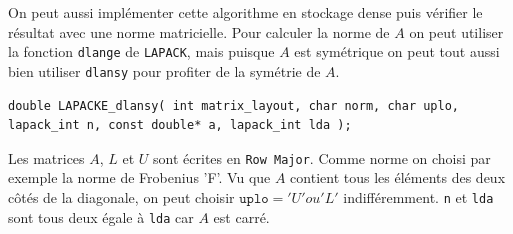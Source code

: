 \documentclass{article}
\begin{document}
On peut aussi implémenter cette algorithme en stockage dense puis vérifier le résultat avec une norme matricielle. Pour calculer la norme de $A$ on peut utiliser la fonction \texttt{dlange} de \texttt{LAPACK}, mais puisque $A$ est symétrique on peut tout aussi bien utiliser \texttt{dlansy} pour profiter de la symétrie de $A$.
\begin{scriptsize}
\begin{verbatim}
double LAPACKE_dlansy( int matrix_layout, char norm, char uplo, lapack_int n, const double* a, lapack_int lda );
\end{verbatim}
\end{scriptsize}
Les matrices $A$, $L$ et $U$ sont écrites en \texttt{Row Major}. Comme norme on choisi par exemple la norme de Frobenius 'F'. Vu que $A$ contient tous les éléments des deux côtés de la diagonale, on peut choisir $\texttt{uplo} = 'U' ou 'L'$ indifféremment. \texttt{n} et \texttt{lda} sont tous deux égale à \texttt{lda} car $A$ est carré.
\end{document}
